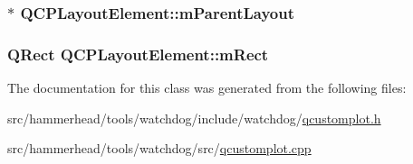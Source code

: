 \subsubsection[{\texorpdfstring{m\+Parent\+Layout}{mParentLayout}}]{$\ast$ Q\+C\+P\+Layout\+Element\+::m\+Parent\+Layout\hspace{0.3cm}{\ttfamily [protected]}}\hypertarget{classQCPLayoutElement_ae7c75c25549608bd688bdb65d4c38066}{}\label{classQCPLayoutElement_ae7c75c25549608bd688bdb65d4c38066}
\subsubsection[{\texorpdfstring{m\+Rect}{mRect}}]{\setlength{\rightskip}{0pt plus 5cm}Q\+Rect Q\+C\+P\+Layout\+Element\+::m\+Rect\hspace{0.3cm}{\ttfamily [protected]}}\hypertarget{classQCPLayoutElement_ad8896f05550389f7b9e92c9e6cdf6e01}{}\label{classQCPLayoutElement_ad8896f05550389f7b9e92c9e6cdf6e01}


The documentation for this class was generated from the following files\+:\begin{DoxyCompactItemize}
\item 
src/hammerhead/tools/watchdog/include/watchdog/\hyperlink{qcustomplot_8h}{qcustomplot.\+h}\item 
src/hammerhead/tools/watchdog/src/\hyperlink{qcustomplot_8cpp}{qcustomplot.\+cpp}\end{DoxyCompactItemize}
